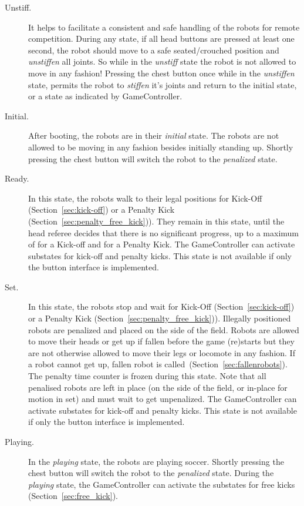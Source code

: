 \begin{description}
  \item [Unstiff.] It helps to facilitate a consistent and safe handling of the robots for remote competition. During any state, if all head buttons are pressed at least one second, the robot should move to a safe seated/crouched position and \textit{unstiffen} all joints. So while in the \textit{unstiff} state the robot is not allowed to move in any fashion! Pressing the chest button once while in the \textit{unstiffen} state, permits the robot to \textit{stiffen} it’s joints and return to the initial state, or a state as indicated by GameController.

  \item[Initial.] After booting, the robots are in their \emph{initial} state. The robots are not allowed to be moving in any fashion besides initially standing up. Shortly pressing the chest button will switch the robot to the \emph{penalized} state.

  \item[Ready.] In this state, the robots walk to their legal positions for Kick-Off  (\cf Section~\ref{sec:kick-off}) or a Penalty Kick (\cf Section~\ref{sec:penalty_free_kick})). They remain in this state, until the head referee decides that there is no significant progress, up to a maximum of \KickOffAutoTime for a Kick-off and \PenaltyFreeKickSetupTime for a Penalty Kick.
  The GameController can activate substates for kick-off and penalty kicks.
  This state is not available if only the button interface is implemented.

  \item[Set.] In this state, the robots stop and wait for Kick-Off  (\cf Section~\ref{sec:kick-off}) or a Penalty Kick (\cf Section~\ref{sec:penalty_free_kick})).
  Illegally positioned robots are penalized and placed on the side of the field.
  Robots are allowed to move their heads or get up if fallen before the game (re)starts but they are not otherwise allowed to move their legs or locomote in any fashion.
  If a robot cannot get up, fallen robot is called~(\cf Section~\ref{sec:fallenrobots}).
  The penalty time counter is frozen during this state.
  Note that all penalised robots are left in place (on the side of the field, or in-place for motion in set) and must wait to get unpenalized.
  The GameController can activate substates for kick-off and penalty kicks.
  This state is not available if only the button interface is implemented.

  \item[Playing.] In the \emph{playing} state, the robots are playing soccer. Shortly pressing the chest button will switch the robot to the \emph{penalized} state. During the \emph{playing} state, the GameController can activate the substates for free kicks (\cf Section~\ref{sec:free_kick}).


\end{description}
